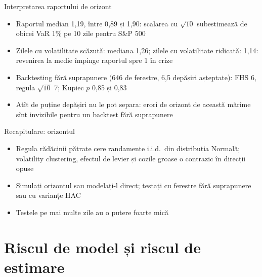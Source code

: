 \begin{frame}{Interpretarea raportului de orizont}
\itemsize{\small}
\begin{itemize}
    \item Raportul median 1{,}19, între 0{,}89 și 1{,}90: scalarea cu $\sqrt{10}$ subestimează de obicei VaR 1\% pe 10 zile pentru S\&P 500
    \item Zilele cu volatilitate scăzută: mediana 1{,}26; zilele cu volatilitate ridicată: 1{,}14: revenirea la medie împinge raportul spre 1 în crize
    \item Backtesting fără suprapunere (646 de ferestre, 6{,}5 depășiri așteptate): FHS 6, regula $\sqrt{10}$ 7; Kupiec $p$ 0{,}85 și 0{,}83
    \item Atît de puține depășiri nu le pot separa: erori de orizont de această mărime sînt invizibile pentru un backtest fără suprapunere
\end{itemize}
\end{frame}

\begin{frame}{Recapitulare: orizontul}
\itemsize{\small}
\begin{itemize}
    \item Regula rădăcinii pătrate cere randamente i.i.d.\ din distribuția Normală; volatility clustering, efectul de levier și cozile groase o contrazic în direcții opuse
    \item Simulați orizontul sau modelați-l direct; testați cu ferestre fără suprapunere sau cu varianțe HAC
    \item Testele pe mai multe zile au o putere foarte mică
\end{itemize}
\end{frame}


\section{Riscul de model și riscul de estimare}

